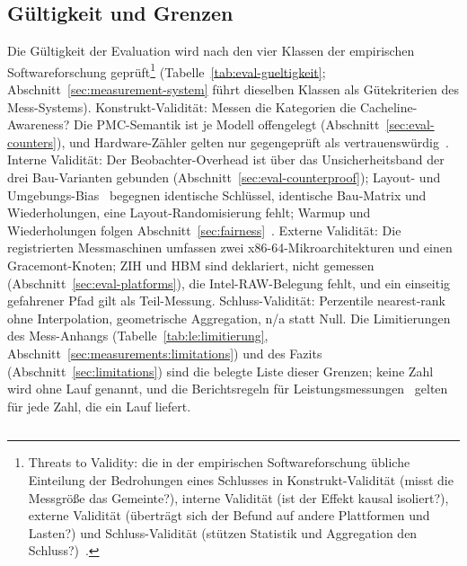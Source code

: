 \begin{nurlang}
\subsection{Gültigkeit und Grenzen}\label{sec:eval-validity}
Die Gültigkeit der Evaluation wird nach den vier Klassen der empirischen Softwareforschung
geprüft\footnote{Threats to Validity: die in der empirischen Softwareforschung übliche Einteilung der
Bedrohungen eines Schlusses in Konstrukt-Validität (misst die Messgröße das Gemeinte?), interne
Validität (ist der Effekt kausal isoliert?), externe Validität (überträgt sich der Befund auf andere
Plattformen und Lasten?) und Schluss-Validität (stützen Statistik und Aggregation den
Schluss?)~\cite{wohlin2012experimentation}.} (Tabelle~\ref{tab:eval-gueltigkeit};
Abschnitt~\ref{sec:measurement-system} führt dieselben Klassen als Gütekriterien des Mess-Systems).
Konstrukt-Validität: Messen die Kategorien die Cacheline-Awareness? Die PMC-Semantik ist je Modell
offengelegt (Abschnitt~\ref{sec:eval-counters}), und Hardware-Zähler gelten nur gegengeprüft als
vertrauenswürdig~\cite{weaver2008counters}. Interne Validität: Der Beobachter-Overhead ist über das
Unsicherheitsband der drei Bau-Varianten gebunden (Abschnitt~\ref{sec:eval-counterproof}); Layout- und
Umgebungs-Bias~\cite{mytkowicz2009wrongdata,curtsinger2013stabilizer} begegnen identische Schlüssel,
identische Bau-Matrix und Wiederholungen, eine Layout-Randomisierung fehlt; Warmup und
Wiederholungen folgen Abschnitt~\ref{sec:fairness}~\cite{kalibera2013rigorous}. Externe Validität: Die
registrierten Messmaschinen umfassen zwei x86-64-Mikroarchitekturen und einen Gracemont-Knoten; ZIH und HBM
sind deklariert, nicht gemessen (Abschnitt~\ref{sec:eval-platforms}), die Intel-RAW-Belegung fehlt,
und ein einseitig gefahrener Pfad gilt als Teil-Messung. Schluss-Validität: Perzentile nearest-rank ohne
Interpolation, geometrische Aggregation, n/a statt Null. Die Limitierungen des Mess-Anhangs
(Tabelle~\ref{tab:le:limitierung}, Abschnitt~\ref{sec:measurements:limitations}) und des Fazits
(Abschnitt~\ref{sec:limitations}) sind die belegte Liste dieser Grenzen; keine Zahl wird ohne Lauf
genannt, und die Berichtsregeln für Leistungsmessungen~\cite{hoefler2015benchmarking,blackburn2016truth}
gelten für jede Zahl, die ein Lauf liefert.
\begin{table}[htbp]\centering\footnotesize
\begin{tabular}{@{}>{\raggedright\arraybackslash}p{1.6cm}>{\raggedright\arraybackslash}p{4.0cm}>{\raggedright\arraybackslash}p{4.9cm}>{\raggedright\arraybackslash}p{3.7cm}@{}}

\end{tabular}
\end{table}
\end{nurlang}
